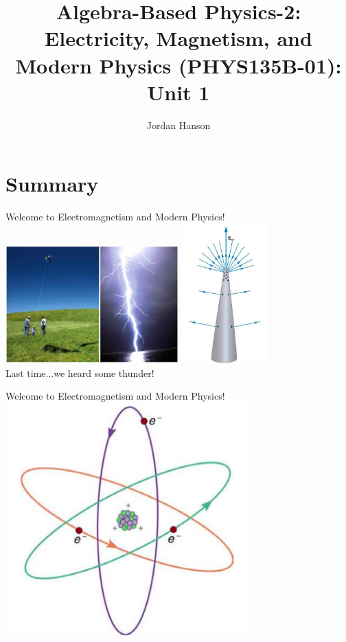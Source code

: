 \documentclass{beamer}
\title{Algebra-Based Physics-2: Electricity, Magnetism, and Modern Physics (PHYS135B-01): Unit 1}
\author{Jordan Hanson}
\institute{Whittier College Department of Physics and Astronomy}
\begin{document}
\maketitle

\section{Summary}

\begin{frame}{Welcome to Electromagnetism and Modern Physics!}
\centering
\includegraphics[width=0.5\textwidth]{figures/lightning.png}
\includegraphics[width=0.25\textwidth]{figures/lightning2.png} \\
Last time...we heard some thunder!
\end{frame}

\begin{frame}{Welcome to Electromagnetism and Modern Physics!}
\centering
\includegraphics[width=0.7\textwidth]{figures/orbital.png}
\end{frame}
\end{document}

